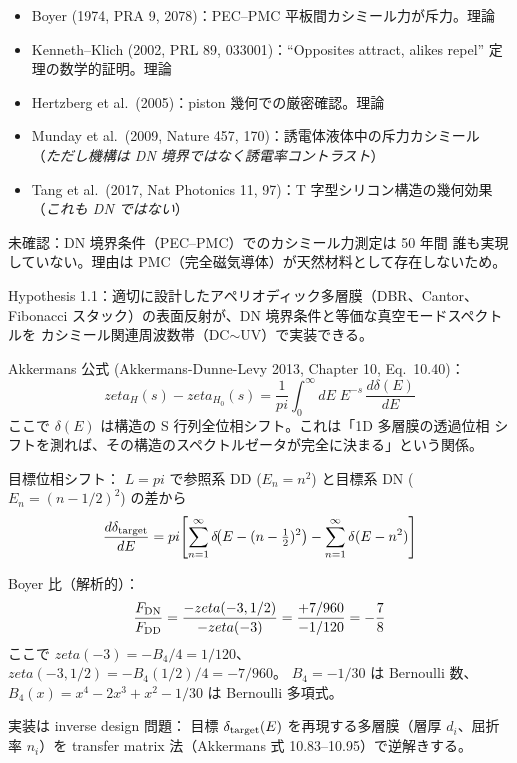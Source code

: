 \documentclass[11pt,a4paper]{article}
\def\pi{pi}%
\def\zeta{zeta}%
\def\textbf#1{#1}%
\begin{document}
\begin{confirmedbox}
\begin{itemize}
\item Boyer (1974, PRA 9, 2078)：PEC--PMC 平板間カシミール力が斥力。\textbf{理論}
\item Kenneth--Klich (2002, PRL 89, 033001)：``Opposites attract, alikes repel''
  定理の数学的証明。\textbf{理論}
\item Hertzberg et al.\ (2005)：piston 幾何での厳密確認。\textbf{理論}
\item Munday et al.\ (2009, Nature 457, 170)：誘電体液体中の斥力カシミール
  （\emph{ただし機構は DN 境界ではなく誘電率コントラスト}）
\item Tang et al.\ (2017, Nat Photonics 11, 97)：T 字型シリコン構造の幾何効果
  （\emph{これも DN ではない}）
\end{itemize}

\textbf{未確認}：DN 境界条件（PEC--PMC）でのカシミール力測定は \textbf{50 年間
誰も実現していない}。理由は PMC（完全磁気導体）が天然材料として存在しないため。
\end{confirmedbox}

\begin{hypothesisbox}
\textbf{Hypothesis 1.1}：適切に設計したアペリオディック多層膜（DBR、Cantor、
Fibonacci スタック）の表面反射が、DN 境界条件と等価な真空モードスペクトルを
カシミール関連周波数帯（DC$\sim$UV）で実装できる。
\end{hypothesisbox}

\begin{theorybox}
\textbf{Akkermans 公式 (Akkermans-Dunne-Levy 2013, Chapter 10, Eq.\ 10.40)}：
\[
  \zeta_H(s) - \zeta_{H_0}(s) = \frac{1}{\pi}\int_0^\infty dE\;E^{-s}\,\frac{d\delta(E)}{dE}
\]
ここで $\delta(E)$ は構造の S 行列全位相シフト。これは「1D 多層膜の透過位相
シフトを測れば、その構造のスペクトルゼータが完全に決まる」という関係。

\textbf{目標位相シフト}：
$L = \pi$ で参照系 DD ($E_n = n^2$) と目標系 DN ($E_n = (n - 1/2)^2$) の差から
\[
  \frac{d\delta_{\rm target}}{dE} = \pi\!\left[\sum_{n=1}^\infty \delta\!\bigl(E - (n - \tfrac12)^2\bigr) - \sum_{n=1}^\infty \delta(E - n^2)\right]
\]

\textbf{Boyer 比（解析的）}：
\[
  \frac{F_{\rm DN}}{F_{\rm DD}}
  = \frac{-\zeta(-3, 1/2)}{-\zeta(-3)}
  = \frac{+7/960}{-1/120}
  = -\frac{7}{8}
\]
ここで $\zeta(-3) = -B_4/4 = 1/120$、$\zeta(-3, 1/2) = -B_4(1/2)/4 = -7/960$。
$B_4 = -1/30$ は Bernoulli 数、$B_4(x) = x^4 - 2x^3 + x^2 - 1/30$ は
Bernoulli 多項式。

\textbf{実装は inverse design 問題}：
目標 $\delta_{\rm target}(E)$ を再現する多層膜（層厚 $d_i$、屈折率 $n_i$）を
transfer matrix 法（Akkermans 式 10.83--10.95）で逆解きする。
\end{theorybox}
\end{document}
